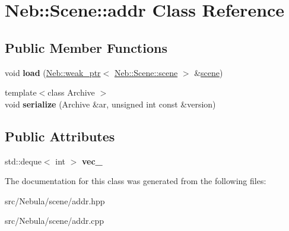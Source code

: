 \hypertarget{classNeb_1_1Scene_1_1addr}{\section{\-Neb\-:\-:\-Scene\-:\-:addr \-Class \-Reference}
\label{classNeb_1_1Scene_1_1addr}
}
\subsection*{\-Public \-Member \-Functions}
\begin{DoxyCompactItemize}
\item 
\hypertarget{classNeb_1_1Scene_1_1addr_a292f11892b0e53c5e341b6d14406ddb3}{void {\bfseries load} (\hyperlink{classNeb_1_1weak__ptr}{\-Neb\-::weak\-\_\-ptr}$<$ \hyperlink{classNeb_1_1Scene_1_1scene}{\-Neb\-::\-Scene\-::scene} $>$ \&\hyperlink{classNeb_1_1Scene_1_1scene}{scene})}\label{classNeb_1_1Scene_1_1addr_a292f11892b0e53c5e341b6d14406ddb3}

\item 
\hypertarget{classNeb_1_1Scene_1_1addr_a7b2713d33985723f3992657b67f8ddf1}{{\footnotesize template$<$class Archive $>$ }\\void {\bfseries serialize} (\-Archive \&ar, unsigned int const \&version)}\label{classNeb_1_1Scene_1_1addr_a7b2713d33985723f3992657b67f8ddf1}

\end{DoxyCompactItemize}
\subsection*{\-Public \-Attributes}
\begin{DoxyCompactItemize}
\item 
\hypertarget{classNeb_1_1Scene_1_1addr_a030f81b696ac01ed8fd741694ee2d2ba}{std\-::deque$<$ int $>$ {\bfseries vec\-\_\-}}\label{classNeb_1_1Scene_1_1addr_a030f81b696ac01ed8fd741694ee2d2ba}

\end{DoxyCompactItemize}


\-The documentation for this class was generated from the following files\-:\begin{DoxyCompactItemize}
\item 
src/\-Nebula/scene/addr.\-hpp\item 
src/\-Nebula/scene/addr.\-cpp\end{DoxyCompactItemize}
